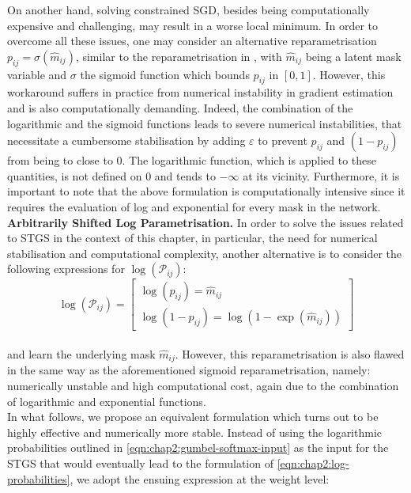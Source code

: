 On another hand, solving constrained SGD, besides being computationally
expensive and challenging, may result in a worse local minimum. In order to
overcome all these issues, one may consider an alternative reparametrisation
$p_{ij}=\sigma(\hat{m}_{ij})$, similar to the reparametrisation in
\cite{DBLP:conf/nips/ZhouLLY19}, with $\hat{m}_{ij}$ being a latent mask
variable and $\sigma$ the sigmoid function which bounds $p_{ij}$ in $[0,1]$.
However, this workaround suffers in practice from numerical instability in
gradient estimation and is also computationally demanding. Indeed, the
combination of the logarithmic and the sigmoid functions leads to severe
numerical instabilities, that necessitate a cumbersome stabilisation by adding
$\varepsilon$ to prevent $p_{ij}$ and $(1-p_{ij})$ from being to close to 0. The
logarithmic function, which is applied to these quantities, is not defined on 0
and tends to $-\infty$ at its vicinity. Furthermore, it is important to note
that the above formulation is computationally intensive since it requires the
evaluation of log and exponential for every mask in the network.\\


\noindent\textbf{Arbitrarily Shifted Log Parametrisation.} In order to solve the
issues related to \ac{STGS} in the context of this chapter, in particular, the
need for numerical stabilisation and computational complexity, another
alternative is to consider the following expressions for
$\log(\mathcal{P}_{ij})$:\\

\begin{equation}
  \label{eqn:chap2:log-probabilities}
  \log(\mathcal{P}_{ij}) =
  \begin{bmatrix}
    \log(p_{ij}) = \hat{m}_{ij} \\
    \log(1-p_{ij}) = \log(1-\exp(\hat{m}_{ij}))
  \end{bmatrix}
\end{equation}\\

\noindent and learn the underlying mask $\hat{m}_{ij}$. However, this
reparametrisation is also flawed in the same way as the aforementioned sigmoid
reparametrisation, namely: numerically unstable and high computational cost,
again due to the combination of logarithmic and exponential functions.\\

In what follows, we propose an equivalent formulation which turns out to be
highly effective and numerically more stable.  Instead of using the logarithmic
probabilities outlined in \cref{eqn:chap2:gumbel-softmax-input} as the input for
the \ac{STGS} that would eventually lead to the formulation of
\cref{eqn:chap2:log-probabilities}, we adopt the ensuing expression at the
weight level:\\

